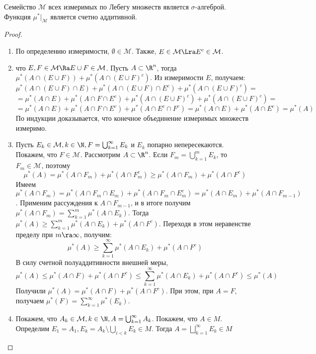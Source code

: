 \begin{theorem}[Каратиодори]
    Семейство \(\mathcal{M}\) всех измеримых по Лебегу множеств является \(\sigma\)-алгеброй. Функция \(\mu^*|_{\mathcal{M}}\) является счетно аддитивной.
\end{theorem}
\begin{proof}
    \begin{enumerate}
        \item По определению измеримости, \(\emptyset \in \mathcal{M}\). Также, \(E \in \mathcal{M} \Lra E^c \in \mathcal{M}\).
        \item что \(E, F \in \mathcal{M} \Ra E \cup F \in \mathcal{M}\). Пусть \(A \subset \R^n\), тогда \(\mu^*(A \cap (E \cup F)) + \mu^*(A \cap (E \cup F)^c)\). Из измеримости \(E\), получаем: 
        \[\mu^*(A \cap (E \cup F) \cap E) + \mu^*(A \cap (E \cup F) \cap E^c) + \mu^*(A \cap (E \cup F)^c) =\]
        \[= \mu^*(A \cap E) + \mu^*(A \cap F \cap E^c) + \mu^*(A \cap (E\cup F)^c) + \mu^*(A \cap (E \cup F)^c) = \]
        \[= \mu^*(A \cap E) + \mu^*(A \cap F \cap E^c) + \mu^*(A \cap E^c\cap F^c)= \mu^*(A \cap E) + \mu^*(A \cap E^c) = \mu^*(A)\]
        По индукции доказывается, что конечное объединение измеримых множеств измеримо.
        \item Пусть \(E_k \in \mathcal{M}, k \in \N, F = \bigcup_{k = 1}^\infty E_k\) и \(E_k\) попарно непересекаются. Покажем, что \(F \in \mathcal{M}\). Рассмотрим \(A \subset \R^n\). Если \(F_m = \bigcup_{k = 1}^m E_k\), то \(F_m \in \mathcal{M}\), поэтому 
        \[\mu^*(A) = \mu^*(A \cap F_m) + \mu^*(A \cap F_m^c) \ge \mu^*(A \cap F_m) + \mu^*(A \cap F^c)\]
        Имеем \(\mu^*(A \cap F_m) = \mu^*(A \cap F_m \cap E_m) + \mu^*(A \cap F_m \cap E_m^c) = \mu^*(A \cap E_m) + \mu^*(A \cap F_{m - 1})\). Применим рассуждения к \(A \cap F_{m - 1}\), и в итоге получим \(\mu^*(A \cap F_m) = \sum_{k = 1}^m \mu^*(A \cap E_k)\). Тогда \(\mu^*(A) \ge \sum_{k = 1}^m \mu^*(A \cap E_k) + \mu^*(A \cap F^c)\). Переходя в этом неравенстве пределу при \(m \ra \infty\), получим:
        \[\mu^*(A) \ge \sum_{k = 1}^\infty \mu^*(A \cap E_k) + \mu^*(A \cap F^c)\]
        В силу счетной полуаддитивности внешней меры, 
        \[\mu^*(A) \le \mu^*(A \cap F) + \mu^*(A \cap F^c) \le \sum_{k = 1}^\infty\mu^*(A \cap E_k) + \mu^*(A \cap F^c) \le \mu^*(A)\]
        Получили \(\mu^*(A) = \mu^*(A \cap F) + \mu^*(A \cap F^c)\). При этом, при \(A = F\), получаем \(\mu^*(F) = \sum_{k = 1}^\infty \mu^*(E_k)\).
        \item Покажем, что \(A_k \in \mathcal{M}, k \in \N, A = \bigcup_{k = 1}^\infty A_k\). Покажем, что \(A \in M\). Определим \(E_1 = A_1, E_k = A_k \setminus \bigcup_{i < k} E_k \in M\). Тогда \(A = \bigsqcup_{k = 1}^\infty E_k \in M\)
    \end{enumerate}
\end{proof}

